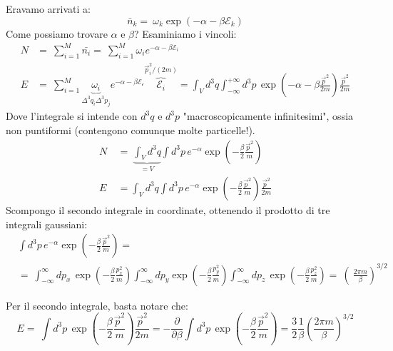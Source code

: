 \documentclass[../MeccanicaStatistica.tex]{subfiles}
\begin{document}
Eravamo arrivati a:
\[
\bar{n}_k =\ \omega_k \exp(-\alpha -\beta\mathcal{E}_k)
\]
Come possiamo trovare $\alpha$ e $\beta$? Esaminiamo i vincoli:
\begin{align*}
N &=\ \sum_{i=1}^M \bar{n_i} =\ \sum_{i=1}^M \omega_i e^{-\alpha -\beta \mathcal{E}_i}\\
E &=\ \sum_{i=1}^M \underbrace{\omega_i}_{\Delta^3 q_i \Delta^3 p_j} e^{-\alpha -\beta\mathcal{E_i}} \overbrace{\mathcal{E}_i}^{\vec{p}_i^2/(2m)} = \int_V d^3 q \int_{-\infty}^{+\infty} d^3 p\, \exp \left (-\alpha -\beta \frac{\vec{p}^2}{2m} \right ) \frac{\vec{p}^2}{2m}
\end{align*}
Dove l'integrale si intende con $d^3 q $ e $d^3 p$ "macroscopicamente infinitesimi", ossia non puntiformi (contengono comunque molte particelle!).\\
\begin{align*}
N\ &=\ \underbrace{\int_V d^3 q}_{=V} \int d^3 p\, e^{-\alpha} \exp\left(-\frac{\beta}{2}\frac{\vec{p}^2}{m}\right )\\
E\ &= \int_V d^3q \int d^3 p\, e^{-\alpha} \exp\left(-\frac{\beta}{2}\frac{\vec{p}^2}{m}\right) \frac{\vec{p}^2}{2m}
\end{align*}
Scompongo il secondo integrale in coordinate, ottenendo il prodotto di tre integrali gaussiani:
\begin{align*}
&\int d^3 p\, e^{-\alpha} \exp\left(-\frac{\beta}{2}\frac{\vec{p}^2}{m}\right ) =\\
&=\ \int_{-\infty}^{\infty} dp_x \, \exp\left(-\frac{\beta}{2}\frac{p_x^2}{m}\right ) \int_{-\infty}^{\infty} dp_y \exp\left(-\frac{\beta}{2}\frac{p_y^2}{m}\right )
\int_{-\infty}^{\infty} dp_z \, \exp\left(-\frac{\beta}{2}\frac{p_z^2}{m}\right )
 =\ \left (\ \frac{2\pi m}{\beta}\right)^{3/2}
\end{align*}

Per il secondo integrale, basta notare che:
\[
E =\ \int d^3 p\, \exp \left (-\frac{\beta}{2}\frac{\vec{p}^2}{m}\right ) \frac{\vec{p}^2}{2m} = -\frac{\partial}{\partial \beta} \int d^3 p\, \exp\left (-\frac{\beta}{2} \frac{\vec{p}^2}{m}\right ) = \frac{3}{2}\frac{1}{\beta} \left(\frac{2\pi m}{\beta} \right )^{3/2}
\]
\end{document}
